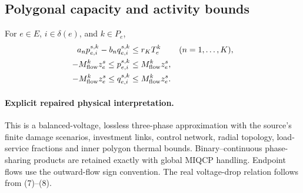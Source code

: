 \documentclass[11pt]{article}
\begin{document}
\subsection{Polygonal capacity and activity bounds}
For $e\in E$, $i\in\delta(e)$, and $k\in P_e$,
\begin{align*}
a_n p_{e,i}^{s,k}-b_n q_{e,i}^{s,k}
 &\leq r_K T_e^k &&(n=1,\ldots,K),\\
-M_{\rm flow}^k z_e^s\leq p_{e,i}^{s,k}
 &\leq M_{\rm flow}^k z_e^s,\\
-M_{\rm flow}^k z_e^s\leq q_{e,i}^{s,k}
 &\leq M_{\rm flow}^k z_e^s.
\end{align*}

\paragraph{Explicit repaired physical interpretation.}
This is a balanced-voltage, lossless three-phase approximation with the source's
finite damage scenarios, investment links, control network, radial topology,
load-service fractions and inner polygon thermal bounds. Binary--continuous
phase-sharing products are retained exactly with global MIQCP handling.
Endpoint flows use the outward-flow sign convention. The real voltage-drop relation follows from (7)--(8).
\end{document}

